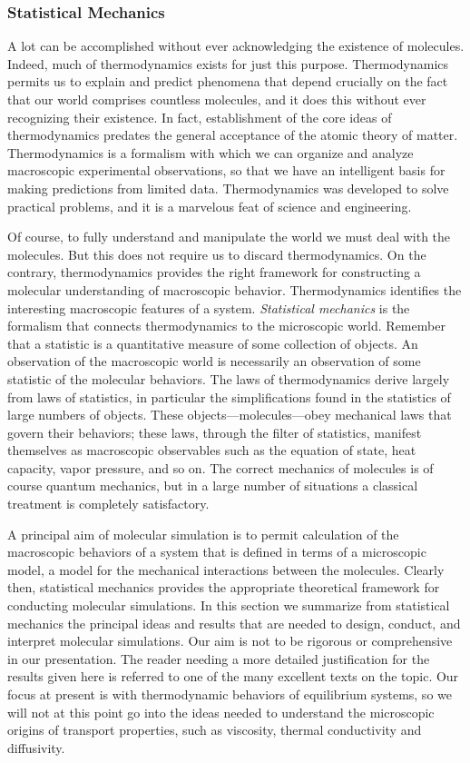 \documentclass[]{article}
\date{}
\begin{document}
\subsubsection{Statistical Mechanics}\label{statistical-mechanics}

A lot can be accomplished without ever acknowledging the existence of
molecules. Indeed, much of thermodynamics exists for just this purpose.
Thermodynamics permits us to explain and predict phenomena that depend
crucially on the fact that our world comprises countless molecules, and
it does this without ever recognizing their existence. In fact,
establishment of the core ideas of thermodynamics predates the general
acceptance of the atomic theory of matter. Thermodynamics is a formalism
with which we can organize and analyze macroscopic experimental
observations, so that we have an intelligent basis for making
predictions from limited data. Thermodynamics was developed to solve
practical problems, and it is a marvelous feat of science and
engineering.

Of course, to fully understand and manipulate the world we must deal
with the molecules. But this does not require us to discard
thermodynamics. On the contrary, thermodynamics provides the right
framework for constructing a molecular understanding of macroscopic
behavior. Thermodynamics identifies the interesting macroscopic features
of a system. \emph{Statistical mechanics} is the formalism that connects
thermodynamics to the microscopic world. Remember that a statistic is a
quantitative measure of some collection of objects. An observation of
the macroscopic world is necessarily an observation of some statistic of
the molecular behaviors. The laws of thermodynamics derive largely from
laws of statistics, in particular the simplifications found in the
statistics of large numbers of objects. These objects---molecules---obey
mechanical laws that govern their behaviors; these laws, through the
filter of statistics, manifest themselves as macroscopic observables
such as the equation of state, heat capacity, vapor pressure, and so on.
The correct mechanics of molecules is of course quantum mechanics, but
in a large number of situations a classical treatment is completely
satisfactory.

A principal aim of molecular simulation is to permit calculation of the
macroscopic behaviors of a system that is defined in terms of a
microscopic model, a model for the mechanical interactions between the
molecules. Clearly then, statistical mechanics provides the appropriate
theoretical framework for conducting molecular simulations. In this
section we summarize from statistical mechanics the principal ideas and
results that are needed to design, conduct, and interpret molecular
simulations. Our aim is not to be rigorous or comprehensive in our
presentation. The reader needing a more detailed justification for the
results given here is referred to one of the many excellent texts on the
topic. Our focus at present is with thermodynamic behaviors of
equilibrium systems, so we will not at this point go into the ideas
needed to understand the microscopic origins of transport properties,
such as viscosity, thermal conductivity and diffusivity.
\end{document}
